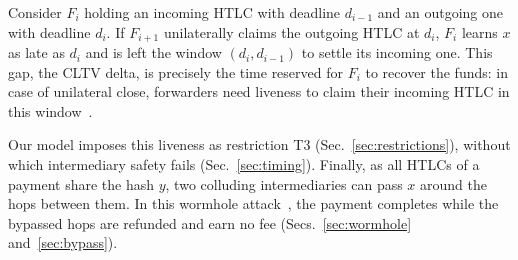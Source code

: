 \begin{remark}\label{rmk:deadlines}
Consider $F_i$ holding an incoming HTLC with deadline $d_{i-1}$ and an outgoing
one with deadline $d_i$. If $F_{i+1}$ unilaterally claims the outgoing HTLC at
$d_i$, $F_i$ learns $x$ as late as $d_i$ and is left the window
$(d_i, d_{i-1})$ to settle its incoming one. This gap, the CLTV delta, is
precisely the time reserved for $F_i$ to recover the funds: in case of
unilateral close, forwarders need liveness to claim their incoming HTLC in this
window~\cite{mccorry2019}.
\end{remark}

Our model imposes this liveness as restriction T3
(Sec.~\ref{sec:restrictions}), without which intermediary safety fails
(Sec.~\ref{sec:timing}). Finally, as all HTLCs of a payment share the hash $y$,
two colluding intermediaries can pass $x$ around the hops between them. In
this wormhole attack~\cite{malavolta2019}, the payment completes while the
bypassed hops are refunded and earn no fee (Secs.~\ref{sec:wormhole}
and~\ref{sec:bypass}).
